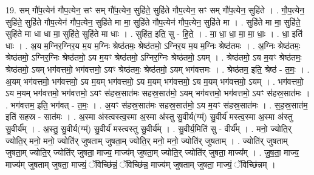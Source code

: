 \documentclass[17pt]{extarticle}
\begin{document}
19. सम् गौ॑प॒त्येन॑ गौप॒त्येन॒ सꣳ सम् गौ॑प॒त्येन॒ सुहि॑ते॒ सुहि॑ते गौप॒त्येन॒ सꣳ सम् गौ॑प॒त्येन॒ सुहि॑ते । . गौ॒प॒त्येन॒ सुहि॑ते॒ सुहि॑ते गौप॒त्येन॑ गौप॒त्येन॒ सुहि॑ते मा मा॒ सुहि॑ते गौप॒त्येन॑ गौप॒त्येन॒ सुहि॑ते मा । . सुहि॑ते मा मा॒ सुहि॑ते॒ सुहि॑ते मा धा धा मा॒ सुहि॑ते॒ सुहि॑ते मा धाः । . सुहि॑त॒ इति॒ सु - हि॒ते॒ । . मा॒ धा॒ धा॒ मा॒ मा॒ धाः॒ । . धा॒ इति॑ धाः । . अ॒य म॒ग्निर॒ग्निर॒य म॒य म॒ग्निः श्रेष्ठ॑तमः॒ श्रेष्ठ॑तमो॒ ऽग्निर॒य म॒य म॒ग्निः श्रेष्ठ॑तमः । . अ॒ग्निः श्रेष्ठ॑तमः॒ श्रेष्ठ॑तमो॒ ऽग्निर॒ग्निः श्रेष्ठ॑तमो॒ ऽय म॒यꣳ श्रेष्ठ॑तमो॒ ऽग्निर॒ग्निः श्रेष्ठ॑तमो॒ ऽयम् । . श्रेष्ठ॑तमो॒ ऽय म॒यꣳ श्रेष्ठ॑तमः॒ श्रेष्ठ॑तमो॒ ऽयम् भग॑वत्तमो॒ भग॑वत्तमो॒ ऽयꣳ श्रेष्ठ॑तमः॒ श्रेष्ठ॑तमो॒ ऽयम् भग॑वत्तमः । . श्रेष्ठ॑तम॒ इति॒ श्रेष्ठ॑ - त॒मः॒ । . अ॒यम् भग॑वत्तमो॒ भग॑वत्तमो॒ ऽय म॒यम् भग॑वत्तमो॒ ऽय म॒यम् भग॑वत्तमो॒ ऽय म॒यम् भग॑वत्तमो॒ ऽयम् । . भग॑वत्तमो॒ ऽय म॒यम् भग॑वत्तमो॒ भग॑वत्तमो॒ ऽयꣳ स॑हस्र॒सात॑मः सहस्र॒सात॑मो॒ ऽयम् भग॑वत्तमो॒ भग॑वत्तमो॒ ऽयꣳ स॑हस्र॒सात॑मः । . भग॑वत्तम॒ इति॒ भग॑वत् - त॒मः॒ । . अ॒यꣳ स॑हस्र॒सात॑मः सहस्र॒सात॑मो॒ ऽय म॒यꣳ स॑हस्र॒सात॑मः । . स॒ह॒स्र॒सात॑म॒ इति॑ सहस्र - सात॑मः । . अ॒स्मा अ॑स्त्वस्त्व॒स्मा अ॒स्मा अ॑स्तु सु॒वीर्य(ग्म्॑) सु॒वीर्य॑ मस्त्व॒स्मा अ॒स्मा अ॑स्तु सु॒वीर्य᳚म् । . अ॒स्तु॒ सु॒वीर्य(ग्म्॑) सु॒वीर्य॑ मस्त्वस्तु सु॒वीर्य᳚म् । . सु॒वीर्य॒मिति॑ सु - वीर्य᳚म् । . मनो॒ ज्योति॒र् ज्योति॒र् मनो॒ मनो॒ ज्योति॑र् जुषताम् जुषता॒म् ज्योति॒र् मनो॒ मनो॒ ज्योति॑र् जुषताम् । . ज्योति॑र् जुषताम् जुषता॒म् ज्योति॒र् ज्योति॑र् जुषता॒ माज्य॒ माज्य॑म् जुषता॒म् ज्योति॒र् ज्योति॑र् जुषता॒ माज्य᳚म् । . जु॒ष॒ता॒ माज्य॒ माज्य॑म् जुषताम् जुषता॒ माज्यं॒ ॅविच्छि॑न्नं॒ ॅविच्छि॑न्न॒ माज्य॑म् जुषताम् जुषता॒ माज्यं॒ ॅविच्छि॑न्नम् । \newline
\end{document}
